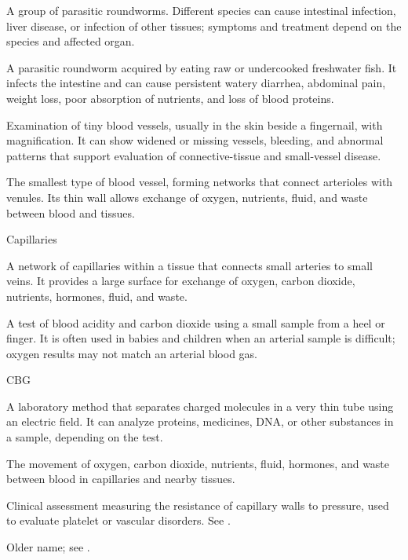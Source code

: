  A group of parasitic roundworms. Different species can cause intestinal infection, liver disease, or infection of other tissues; symptoms and treatment depend on the species and affected organ.

 A parasitic roundworm acquired by eating raw or undercooked freshwater fish. It infects the intestine and can cause persistent watery diarrhea, abdominal pain, weight loss, poor absorption of nutrients, and loss of blood proteins.

 Examination of tiny blood vessels, usually in the skin beside a fingernail, with magnification. It can show widened or missing vessels, bleeding, and abnormal patterns that support evaluation of connective-tissue and small-vessel disease.

 The smallest type of blood vessel, forming networks that connect arterioles with venules. Its thin wall allows exchange of oxygen, nutrients, fluid, and waste between blood and tissues.

\synonyms
Capillaries

 A network of capillaries within a tissue that connects small arteries to small veins. It provides a large surface for exchange of oxygen, carbon dioxide, nutrients, hormones, fluid, and waste.

 A test of blood acidity and carbon dioxide using a small sample from a heel or finger. It is often used in babies and children when an arterial sample is difficult; oxygen results may not match an arterial blood gas.

\synonyms
CBG

 A laboratory method that separates charged molecules in a very thin tube using an electric field. It can analyze proteins, medicines, DNA, or other substances in a sample, depending on the test.

 The movement of oxygen, carbon dioxide, nutrients, fluid, hormones, and waste between blood in capillaries and nearby tissues.

 Clinical assessment measuring the resistance of capillary walls to pressure, used to evaluate platelet or vascular disorders. See .

 Older name; see .

